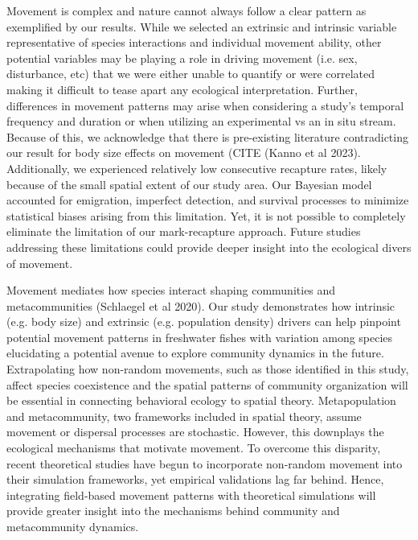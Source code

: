 \documentclass[11pt, class=article, crop=false]{standalone}
\begin{document}
Movement is complex and nature cannot always follow a clear pattern as exemplified by our results. While we selected an extrinsic and intrinsic variable representative of species interactions and individual movement ability, other potential variables may be playing a role in driving movement (i.e. sex, disturbance, etc) that we were either unable to quantify or were correlated making it difficult to tease apart any ecological interpretation. Further, differences in movement patterns may arise when considering a study’s temporal frequency and duration or when utilizing an experimental vs an in situ stream. Because of this, we acknowledge that there is pre-existing literature contradicting our result for body size effects on movement (CITE (Kanno et al 2023). Additionally, we experienced relatively low consecutive recapture rates, likely because of the small spatial extent of our study area. Our Bayesian model accounted for emigration, imperfect detection, and survival processes to minimize statistical biases arising from this limitation. Yet, it is not possible to completely eliminate the limitation of our mark-recapture approach. Future studies addressing these limitations could provide deeper insight into the ecological divers of movement.

Movement mediates how species interact shaping communities and metacommunities (Schlaegel et al 2020). Our study demonstrates how intrinsic (e.g. body size) and extrinsic (e.g. population density) drivers can help pinpoint potential movement patterns in freshwater fishes with variation among species elucidating a potential avenue to explore community dynamics in the future. Extrapolating how non-random movements, such as those identified in this study, affect species coexistence and the spatial patterns of community organization will be essential in connecting behavioral ecology to spatial theory. Metapopulation and metacommunity, two frameworks included in spatial theory, assume movement or dispersal processes are stochastic. However, this downplays the ecological mechanisms that motivate movement. To overcome this disparity, recent theoretical studies have begun to incorporate non-random movement into their simulation frameworks, yet empirical validations lag far behind. Hence, integrating field-based movement patterns with theoretical simulations will provide greater insight into the mechanisms behind community and metacommunity dynamics.


\end{document}
